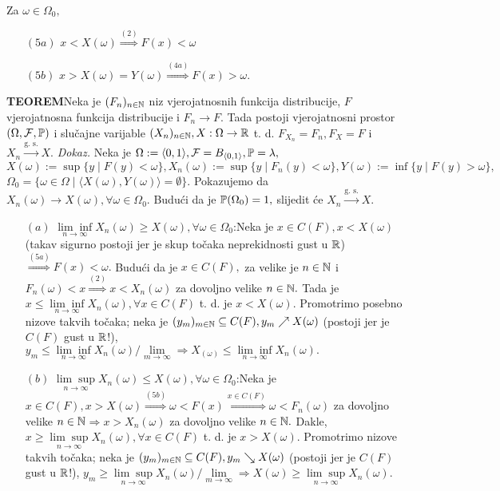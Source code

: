 \documentclass{article}
\newcommand{\mylimsup}{\underset{n\to\infty}{\lim\sup}}
\newcommand{\myliminf}{\underset{n\to\infty}{\lim\inf}}
\begin{document}
Za \(\omega\in\Omega_0,\)
\begin{enumerate}
    \item[\((5a)\)] \(x<X(\omega)\overset{(2)}{\Rightarrow} F(x)<\omega\) 
    \item[\((5b)\)] \(x>X(\omega)=Y(\omega)\overset{(4a)}{\Rightarrow}F(x)>\omega.\)
\end{enumerate}
\textbf{TEOREM}\newline Neka je \((F_n)_{n\in\Bbb N}\) niz vjerojatnosnih funkcija distribucije, \(F\) vjerojatnosna funkcija distribucije i \(F_n\to F.\) Tada postoji vjerojatnosni prostor \((\Omega,\mathcal F,\Bbb P)\) i slučajne varijable \((X_n)_{n\in\Bbb N},X:\Omega\to\Bbb R\) t. d. \(F_{X_n}=F_n,F_X=F\) i \(X_n\overset{\text{g. s.}}{\longrightarrow}X.\)\newline\newline
\textit{Dokaz.}\newline
Neka je \(\Omega:=\langle0,1\rangle,\mathcal F=B_{\langle0,1\rangle},\Bbb P=\lambda,\)\newline \(X(\omega):=\sup\{y\mid F(y)<\omega\},X_n(\omega):=\sup\{y\mid F_n(y)<\omega\},Y(\omega):=\inf\{y\mid F(y)>\omega\},\)\newline \(\Omega_0=\{\omega\in\Omega\mid \langle X(\omega),Y(\omega)\rangle=\emptyset\}.\) Pokazujemo da \(X_n(\omega)\to X(\omega),\forall\omega\in\Omega_0.\) Budući da je \(\Bbb P(\Omega_0)=1,\) slijedit će \(X_n\overset{\text{g. s.}}{\longrightarrow}X.\)
\begin{enumerate}
    \item[\((a)\)] \(\myliminf X_n(\omega)\ge X(\omega),\forall\omega\in\Omega_0\):\newline Neka je \(x\in C(F),x<X(\omega)\) (takav sigurno postoji jer je skup točaka neprekidnosti gust u \(\Bbb R\)) \(\overset{(5a)}{\Rightarrow}F(x)<\omega.\) Budući da je \(x\in C(F),\) za velike je \(n\in\Bbb N\) i \(F_n(\omega)<x\overset{(2)}{\Rightarrow}x<X_n(\omega)\) za dovoljno velike \(n\in\Bbb N.\) Tada je \(x\le\myliminf X_n(\omega),\forall x\in C(F)\) t. d. je \(x<X(\omega).\) Promotrimo posebno nizove takvih točaka; neka je \((y_m)_{m\in\Bbb N}\subseteq C(F),y_m\nearrow X(\omega)\) (postoji jer je \(C(F)\) gust u \(\Bbb R\)!), \(y_m\le\myliminf X_n(\omega)/\lim\limits_{m\to\infty}\Rightarrow X_(\omega)\le\myliminf X_n(\omega).\)
    \item[\((b)\)] \(\mylimsup X_n(\omega)\le X(\omega),\forall\omega\in\Omega_0\):\newline Neka je \(x\in C(F),x>X(\omega)\overset{(5b)}{\Rightarrow}\omega<F(x)\overset{x\in C(F)}{\Rightarrow}\omega<F_n(\omega)\) za dovoljno velike \(n\in\Bbb N\)\(\Rightarrow x>X_n(\omega)\) za dovoljno velike \(n\in\Bbb N.\) Dakle, \(x\ge\mylimsup X_n(\omega),\forall x\in C(F)\) t. d. je \(x>X(\omega).\) Promotrimo nizove takvih točaka; neka je \((y_m)_{m\in\Bbb N}\subseteq C(F),y_m\searrow X(\omega)\) (postoji jer je \(C(F)\) gust u \(\Bbb R\)!), \(y_m\ge\mylimsup X_n(\omega)/\lim\limits_{m\to\infty}\Rightarrow X(\omega)\ge\mylimsup X_n(\omega).\)
\end{enumerate}
\newpage
\end{document}
